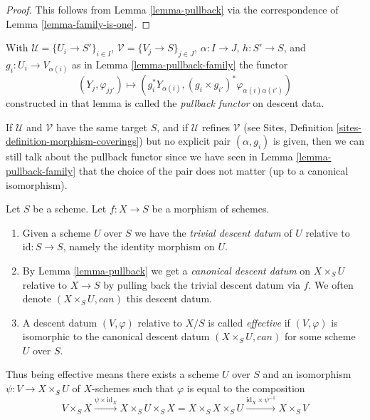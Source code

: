 \begin{proof}
This follows from Lemma \ref{lemma-pullback} via the
correspondence of Lemma \ref{lemma-family-is-one}.
\end{proof}

\begin{definition}
\label{definition-pullback-functor-family}
With $\mathcal{U} = \{U_i \to S'\}_{i \in I}$,
$\mathcal{V} = \{V_j \to S\}_{j \in J}$, $\alpha : I \to J$, $h : S' \to S$,
and $g_i : U_i \to V_{\alpha(i)}$ as in Lemma \ref{lemma-pullback-family}
the functor
$$
(Y_j, \varphi_{jj'}) \longmapsto
(g_i^*Y_{\alpha(i)}, (g_i \times g_{i'})^*\varphi_{\alpha(i)\alpha(i')})
$$
constructed in that lemma
is called the {\it pullback functor} on descent data.
\end{definition}

\noindent
If $\mathcal{U}$ and $\mathcal{V}$ have the same target $S$,
and if $\mathcal{U}$ refines $\mathcal{V}$ (see
Sites, Definition \ref{sites-definition-morphism-coverings})
but no explicit pair $(\alpha, g_i)$ is given, then we can still
talk about the pullback functor since we have seen in
Lemma \ref{lemma-pullback-family} that the choice of the pair does not matter
(up to a canonical isomorphism).


\begin{definition}
\label{definition-effective}
Let $S$ be a scheme.
Let $f : X \to S$ be a morphism of schemes.
\begin{enumerate}
\item  Given a scheme $U$ over $S$ we have the
{\it trivial descent datum} of $U$ relative to
$\text{id} : S \to S$, namely the identity morphism on $U$.
\item By Lemma \ref{lemma-pullback} we get a
{\it canonical descent datum} on $X \times_S U$
relative to $X \to S$ by pulling back the trivial
descent datum via $f$. We often
denote $(X \times_S U, can)$ this descent datum.
\item A descent datum $(V, \varphi)$ relative to $X/S$ is
called {\it effective} if $(V, \varphi)$
is isomorphic to the canonical descent datum
$(X \times_S U, can)$ for some scheme $U$ over $S$.
\end{enumerate}
\end{definition}

\noindent
Thus being effective means there exists a scheme $U$
over $S$ and an isomorphism $\psi : V \to X \times_S U$
of $X$-schemes such that $\varphi$ is equal to the composition
$$
V \times_S X \xrightarrow{\psi \times \text{id}_X}
X \times_S U \times_S X =
X \times_S X \times_S U
\xrightarrow{\text{id}_X \times \psi^{-1}}
X \times_S V
$$

